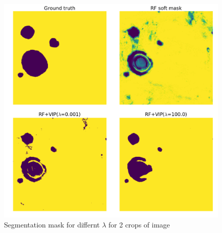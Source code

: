 \begin{figure}[h!] \label{fig:effect}
 \includegraphics[width=1.0\linewidth]{figures/lamda_effect.pdf}
\caption{Segmentation mask for differnt $\lambda$ for 2 crops of image}
\end{figure}


